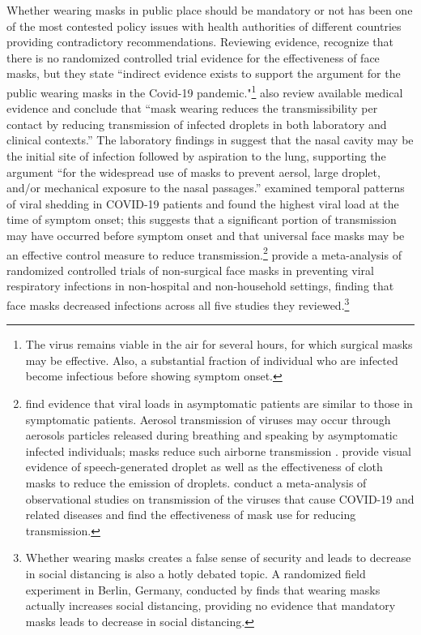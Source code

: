 \documentclass[11pt,reqno,letter]{amsart}
\theoremstyle{definition}
\begin{document}
Whether wearing  masks in public place should be mandatory or not has been one of the most contested policy issues with health authorities of different countries providing contradictory recommendations. Reviewing evidence, \cite{Greenhalghm2020}  recognize that there is no randomized controlled trial evidence for the effectiveness of face masks,  but they state ``indirect evidence exists to support the argument for the public wearing masks in the Covid-19 pandemic."\footnote{The virus remains viable in the air for several hours, for which surgical masks may be effective. Also, a substantial fraction of individual who are infected become infectious before showing symptom onset.}
\cite{howard2020} also review available medical evidence and conclude that ``mask wearing reduces the transmissibility per contact by reducing transmission of infected droplets in both laboratory and clinical contexts.''  The laboratory findings in \cite{hou2020} suggest that the nasal cavity may be the initial site of infection followed by aspiration to the lung, supporting the argument  ``for the widespread use of masks to prevent aersol, large droplet, and/or mechanical exposure to the nasal passages.''   \cite{He2020} examined temporal patterns of viral shedding in COVID-19 patients and found the highest viral load at the time of symptom onset; this suggests that a significant portion of transmission may have occurred before symptom onset and that universal face masks may be an effective control measure to reduce transmission.\footnote{\cite{Lee2020} find evidence that viral loads in asymptomatic patients are similar to those in symptomatic patients. Aerosol transmission of viruses may occur through aerosols particles released during breathing and speaking by asymptomatic infected individuals; masks reduce such airborne transmission \citep{Prather2020}. \cite{Anfinrud2020} provide visual evidence of speech-generated droplet as well as the effectiveness of cloth masks to reduce the emission of droplets.   \cite{Chu2020} conduct a meta-analysis of observational studies on transmission of the viruses that cause COVID-19 and related diseases and find the effectiveness of mask use for reducing transmission. } \cite{ollila2020} provide a meta-analysis of randomized controlled trials of non-surgical face masks in preventing viral respiratory infections in non-hospital and non-household settings, finding that face masks decreased infections across all five studies they reviewed.\footnote{Whether wearing masks creates a false sense of security and leads to decrease in social distancing is also a hotly debated topic.  A randomized field experiment in Berlin, Germany, conducted by \cite{seres2020}  finds that wearing masks actually increases social distancing, providing no evidence that mandatory masks leads to decrease in social distancing.}
\end{document}
